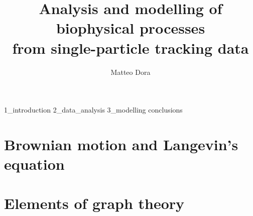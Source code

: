 \documentclass{mthesis}
\title{Analysis and modelling of biophysical processes\\from single-particle tracking data}
\author{Matteo Dora}
\begin{document}
\maketitle

\tableofcontents

{1_introduction}
{2_data_analysis}
{3_modelling}
{conclusions}

\begin{appendices}
  \chapter{Brownian motion and Langevin's equation}
  \chapter{Elements of graph theory}
\end{appendices}

\printbibliography
\end{document}
